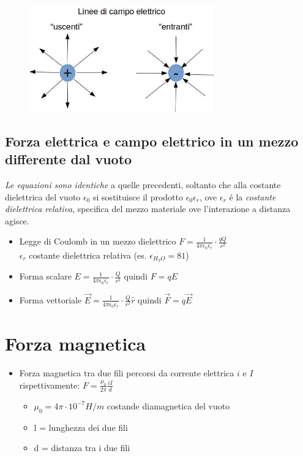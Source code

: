 \documentclass[17pt]{article}
\begin{document}
\begin{figure}[th]
\includegraphics[width=8cm]{lineeCampoElettrico.jpg}
\centering
\end{figure}





\subsection{Forza elettrica e campo elettrico in un mezzo differente dal vuoto}
\emph{Le equazioni sono identiche} a quelle precedenti, soltanto che alla costante dielettrica del vuoto $\epsilon_0$ si sostituisce il prodotto $\epsilon_0\epsilon_r$, ove $\epsilon_r$ \'e la \emph{costante dielettrica relativa}, specifica del mezzo materiale ove l'interazione a distanza agisce.

\begin{itemize}
	\item Legge di Coulomb in un mezzo dielettrico       $F = \frac{1}{4\pi\epsilon_0\epsilon_r}\cdot\frac{qQ}{r^2}$ \\ $\epsilon_r$ costante dielettrica relativa (es. $\epsilon_{H_2O} = 81$)
	\item Forma scalare $E = \frac{1}{4\pi\epsilon_0\epsilon_r}\cdot\frac{Q}{r^2}$ quindi $F = qE$
	\item Forma vettoriale $\vec{E} = \frac{1}{4\pi\epsilon_0\epsilon_r}\cdot\frac{Q}{r^2}\hat{r}$ quindi $\vec{F} = q\vec{E}$
\end{itemize}

\section{Forza magnetica}

\begin{itemize}
	\item Forza magnetica tra due fili percorsi da corrente elettrica $i$ e $I$ rispettivamente: $F = \frac{\mu_0}{2\pi} \frac{iI}{d}$
	\begin{itemize}
		\item $\mu_0 = 4\pi\cdot 10^{-7}H/m$ costande diamagnetica del vuoto
		\item l = lunghezza dei due fili
		\item d = distanza tra i due fili
	\end{itemize}
\end{itemize}
\end{document}
